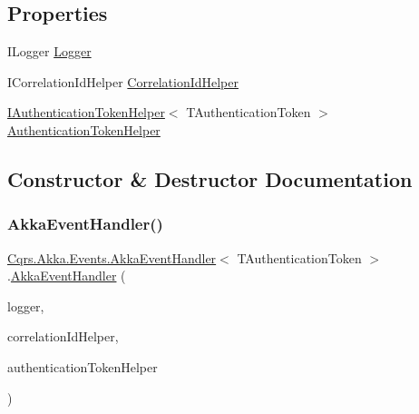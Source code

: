 \subsection*{Properties}
\begin{DoxyCompactItemize}
\item 
I\+Logger \hyperlink{classCqrs_1_1Akka_1_1Events_1_1AkkaEventHandler_af9ccf9b06321f7cbb21934e83005346e}{Logger}
\item 
I\+Correlation\+Id\+Helper \hyperlink{classCqrs_1_1Akka_1_1Events_1_1AkkaEventHandler_a711ada6cc5e9fea454983378f6d5f109}{Correlation\+Id\+Helper}
\item 
\hyperlink{interfaceCqrs_1_1Authentication_1_1IAuthenticationTokenHelper}{I\+Authentication\+Token\+Helper}$<$ T\+Authentication\+Token $>$ \hyperlink{classCqrs_1_1Akka_1_1Events_1_1AkkaEventHandler_a6ab1be5352fea3cad8f8599ab31c0ab6}{Authentication\+Token\+Helper}
\end{DoxyCompactItemize}


\subsection{Constructor \& Destructor Documentation}
\mbox{\label{classCqrs_1_1Akka_1_1Events_1_1AkkaEventHandler_aee50c0ed50e291f311721ca6a103c41f}} 
\subsubsection{\texorpdfstring{Akka\+Event\+Handler()}{AkkaEventHandler()}}
{\footnotesize\ttfamily \hyperlink{classCqrs_1_1Akka_1_1Events_1_1AkkaEventHandler}{Cqrs.\+Akka.\+Events.\+Akka\+Event\+Handler}$<$ T\+Authentication\+Token $>$.\hyperlink{classCqrs_1_1Akka_1_1Events_1_1AkkaEventHandler}{Akka\+Event\+Handler} (\begin{DoxyParamCaption}\item[{I\+Logger}]{logger,  }\item[{I\+Correlation\+Id\+Helper}]{correlation\+Id\+Helper,  }\item[{\hyperlink{interfaceCqrs_1_1Authentication_1_1IAuthenticationTokenHelper}{I\+Authentication\+Token\+Helper}$<$ T\+Authentication\+Token $>$}]{authentication\+Token\+Helper }\end{DoxyParamCaption})\hspace{0.3cm}{\ttfamily [protected]}}



